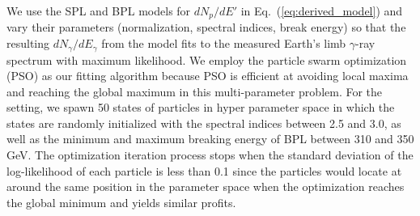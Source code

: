 We use the SPL and BPL models for $dN_p/dE'$ in Eq.~(\ref{eq:derived_model}) and vary their parameters
(normalization, spectral indices, break energy) so that the resulting $dN_\gamma/dE_\gamma$
from the model fits to the measured Earth's limb $\gamma$-ray spectrum with maximum
likelihood. We employ the particle swarm optimization (PSO) \cite{pso_optimize} as our fitting algorithm
because PSO is efficient at avoiding local maxima and reaching the global maximum in
this multi-parameter problem.
For the setting, we spawn 50 states of particles in hyper parameter space
in which the states are randomly initialized with the spectral indices
between 2.5 and 3.0, as well as the minimum and maximum breaking energy of BPL
between 310 and 350 GeV. The optimization iteration process stops when the
standard deviation of the log-likelihood of each particle is less than 0.1
since the particles would locate at around the same position in the parameter
space when the optimization reaches the global minimum and yields similar profits.





